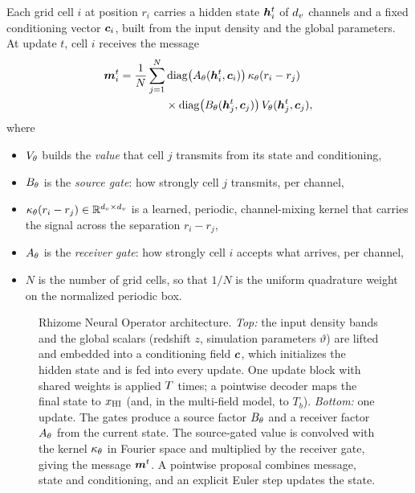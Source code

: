 Each grid cell $i$ at position $r_i$ carries a hidden state $\bm{h}_i^t$ of $d_v$ channels and a fixed conditioning vector $\bm{c}_i$, built from the input density and the global parameters. At update $t$, cell $i$ receives the message
\begin{equation}
  \label{eq:rhizome-message}
  \begin{split}
  \bm{m}_i^t = \frac{1}{N}\sum_{j=1}^{N}
  &\operatorname{diag}\!\big(A_\theta(\bm{h}_i^t,\bm{c}_i)\big)\,
  \kappa_\theta(r_i-r_j)\\
  &\times\operatorname{diag}\!\big(B_\theta(\bm{h}_j^t,\bm{c}_j)\big)\,
  V_\theta(\bm{h}_j^t,\bm{c}_j),
  \end{split}
\end{equation}
where
\begin{itemize}
  \item $V_\theta$ builds the \emph{value} that cell $j$ transmits from its state and conditioning,
  \item $B_\theta$ is the \emph{source gate}: how strongly cell $j$ transmits, per channel,
  \item $\kappa_\theta(r_i-r_j)\in\mathbb{R}^{d_v\times d_v}$ is a learned, periodic, channel-mixing kernel that carries the signal across the separation $r_i-r_j$,
  \item $A_\theta$ is the \emph{receiver gate}: how strongly cell $i$ accepts what arrives, per channel,
  \item $N$ is the number of grid cells, so that $1/N$ is the uniform quadrature weight on the normalized periodic box.
\end{itemize}

\begin{figure}[!tp]
  \centering
  \caption{Rhizome Neural Operator architecture. \emph{Top:} the input density bands and the global scalars (redshift $z$, simulation parameters $\vartheta$) are lifted and embedded into a conditioning field $\bm{c}$, which initializes the hidden state and is fed into every update. One update block with shared weights is applied $T$ times; a pointwise decoder maps the final state to $x_{\mathrm{HI}}$ (and, in the multi-field model, to $T_b$). \emph{Bottom:} one update. The gates produce a source factor $B_\theta$ and a receiver factor $A_\theta$ from the current state. The source-gated value is convolved with the kernel $\kappa_\theta$ in Fourier space and multiplied by the receiver gate, giving the message $\bm{m}^t$. A pointwise proposal combines message, state and conditioning, and an explicit Euler step updates the state.}
  \label{fig:rhizome-architecture}
\end{figure}

